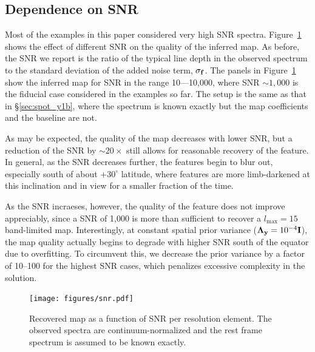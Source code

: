 \documentclass[modern]{aastex631}
\begin{document}
\subsection{Dependence on SNR}
\label{sec:snr}
%
Most of the examples in this paper considered very high SNR spectra.
Figure~\ref{fig:snr} shows the effect of different SNR on the quality of the inferred map. 
As before, the SNR we report is the ratio of the typical line depth in the observed spectrum to the standard deviation of the added noise term, $\sigma_{\mathbf{f}}$.
The panels in Figure~\ref{fig:snr} show the inferred map for SNR in the range 10---10,000, where SNR $\sim 1,000$ is the fiducial case considered in the examples so far. 
The setup is the same as that in \S\ref{sec:spot_y1b}, where the spectrum is known exactly but the map coefficients and the baseline are not.

As may be expected, the quality of the map decreases with lower SNR, but a reduction of the SNR by $\sim 20\times$ still allows for reasonable recovery of the \spot feature. 
In general, as the SNR decreases further, the features begin to blur out, especially south of about $+30^\circ$ latitude, where features are more limb-darkened at this inclination and in view for a smaller fraction of the time.

As the SNR incraeses, however, the quality of the \spot feature does not improve appreciably, since a SNR of 1,000 is more than sufficient to recover a $l_\mathrm{max} = 15$ band-limited map. 
Interestingly, at constant spatial prior variance ($\boldsymbol{\Lambda}_{\mathbf{y}} = 10^{-4}{\mathbf{I}}$), the map quality actually begins to degrade with higher SNR south of the equator due to overfitting.
To circumvent this, we decrease the prior variance by a factor of 10--100 for the highest SNR cases, which penalizes excessive complexity in the solution.

%
\begin{figure}[t!]
    \begin{centering}
        \texttt{[image: figures/snr.pdf]}
        \caption{%
            Recovered \spot map as a function of SNR per resolution element. 
            The observed spectra are continuum-normalized and the rest frame spectrum is assumed to be known exactly.
        }
        \label{fig:snr}
    \end{centering}
\end{figure}
\end{document}
